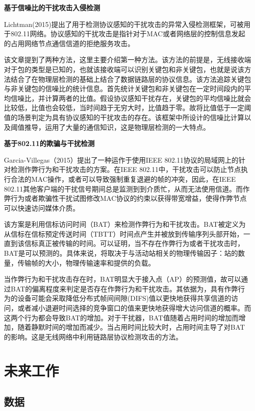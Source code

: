 \documentclass[12pt]{article} %
\begin{document}
\textbf{基于信噪比的干扰攻击入侵检测}

Lichtman(2015)\cite{Lichtman}提出了用于检测协议感知的干扰攻击的异常入侵检测框架，可被用于802.11网络。协议感知的干扰攻击是指针对于MAC或者网络层的控制信息发起的占用网络节点通信信道的拒绝服务攻击。

该文章提到了两种方法，这里主要介绍第一种方法。该方法的前提是，无线接收端对于包的类型是已知的，也就该接收端可以识别关键包和非关键包，也就是说该方法结合了在物理层检测的基础上结合了数据链路层的协议信息。该方法追踪关键包与非关键包的信噪比的统计信息。首先统计关键包和非关键包在一定时间段内的平均信噪比，并计算两者的比值。假设协议感知干扰存在，关键包的平均信噪比就会比较低，比值也会较低，当时间趋于无穷大时，比值趋于零。故将比值低于一定阈值的场景判定为具有协议感知的干扰攻击的存在。该框架中所设计的信噪比计算以及阈值推导，运用了大量的通信知识，这是物理层检测的一大特点。

\textbf{基于802.11的欺骗与干扰检测}

Garcia-Villegas（2015）\cite{Garcia-Villegas}提出了一种运作于使用IEEE 802.11协议的局域网上的针对检测作弊行为和干扰攻击的方案。在IEEE 802.11中，干扰攻击可以防止节点执行合法的MAC操作，或者可以导致强制重复退避的帧的冲突，因此，在IEEE 802.11其他客户端的干扰信号期间总是监测到到介质忙，从而无法使用信道。而作弊行为或者欺骗性干扰试图修改MAC协议的约束以获得带宽增益，使得作弊节点可以快速访问媒体介质。

该方案是利用信标访问时间（BAT）来检测作弊行为和干扰攻击。BAT被定义为从信标在信标预定传送时间（TBTT）时间点产生并被放到传输序列头部开始，一直到该信标真正被传输的时间。可以证明，当不存在作弊行为或者干扰攻击时，BAT是可以预测的。具体来说，将取决于与活动站相关的物理传输因子：站的数量，传输帧的大小，物理传输速率和提供的负载。

当作弊行为和干扰攻击存在时，BAT明显大于接入点（AP）的预测值，故可以通过BAT的偏离程度来判定是否存在作弊行为和干扰攻击。其依据为，具有作弊行为的设备可能会采取降低分布式帧间间隙(DIFS)值以更快地获得共享信道的访问，或者减小退避时间选择的竞争窗口的值来更快地获得增大访问信道的概率。而这两个行为都会导致BAT的增加。对于干扰器，BAT值随着占用时间的增加而增加，随着静默时间的增加而减少。当占用时间比较大时，占用时间主导了对BAT的影响。这是无线网络中利用链路层协议检测攻击的方法。

\section{未来工作}
\label{future}

\subsection{数据}
\label{data}
\end{document}
